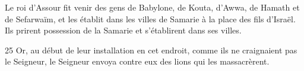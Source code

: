Le roi d’Assour fit venir des gens de Babylone, de Kouta, d’Awwa, de Hamath et de Sefarwaïm, et les établit dans les villes de Samarie à la place des fils d’Israël. Ils prirent possession de la Samarie et s’établirent dans ses villes.

25 Or, au début de leur installation en cet endroit, comme ils ne craignaient pas le Seigneur, le Seigneur envoya contre eux des lions qui les massacrèrent.
